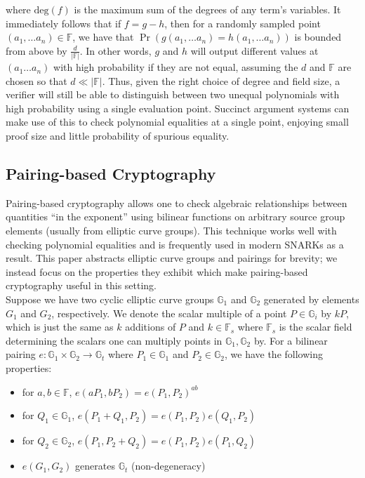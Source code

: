 \noindent where $\text{deg}(f)$ is the maximum sum of the degrees of any term's variables. It immediately follows that if $f = g-h$, then for a randomly sampled point $(a_1, \dots a_n) \in \mathbb{F}$, we have that $\Pr(g(a_1, \dots a_n) = h(a_1, \dots a_n))$ is bounded from above by $\frac{d}{|\mathbb{F}|}$. In other words, $g$ and $h$ will output different values at $(a_1 \dots a_n)$ with high probability if they are not equal, assuming the $d$ and $\mathbb{F}$ are chosen so that $d \ll |\mathbb{F}|$. Thus, given the right choice of degree and field size, a verifier will still be able to distinguish between two unequal polynomials with high probability using a single evaluation point. Succinct argument systems can make use of this to check polynomial equalities at a single point, enjoying small proof size and little probability of spurious equality.

\subsection{Pairing-based Cryptography}
\noindent Pairing-based cryptography \cite{ibepairings} allows one to check algebraic relationships between quantities ``in the exponent'' using bilinear functions on arbitrary source group elements (usually from elliptic curve groups). This technique works well with checking polynomial equalities and is frequently used in modern SNARKs as a result.  This paper abstracts elliptic curve groups and pairings for brevity; we instead focus on the properties they exhibit which make pairing-based cryptography useful in this setting.\\

\noindent Suppose we have two cyclic elliptic curve groups $\mathbb{G}_1$ and $\mathbb{G}_2$ generated by elements $G_1$ and $G_2$, respectively. We denote the scalar multiple of a point $P \in \mathbb{G}_i$ by $kP$, which is just the same as $k$ additions of $P$ and $k \in \mathbb{F}_s$ where $\mathbb{F}_s$ is the scalar field determining the scalars one can multiply points in $\mathbb{G}_1, \mathbb{G}_2$ by. For a bilinear pairing $e: \mathbb{G}_1 \times \mathbb{G}_2 \to \mathbb{G}_t$ where $P_1 \in \mathbb{G}_1$ and $P_2 \in \mathbb{G}_2$, we have the following properties:
\begin{itemize}
    \item for $a, b \in \mathbb{F}$, $e(aP_1, bP_2) = e(P_1, P_2)^{ab}$
    \item for $Q_1 \in \mathbb{G}_1$, $e(P_1+Q_1, P_2) = e(P_1, P_2) e(Q_1, P_2)$
    \item for $Q_2 \in \mathbb{G}_2$, $e(P_1, P_2+Q_2) = e(P_1, P_2) e(P_1, Q_2)$
    \item $e(G_1, G_2)$ generates $\mathbb{G}_t$ (non-degeneracy)
\end{itemize}

